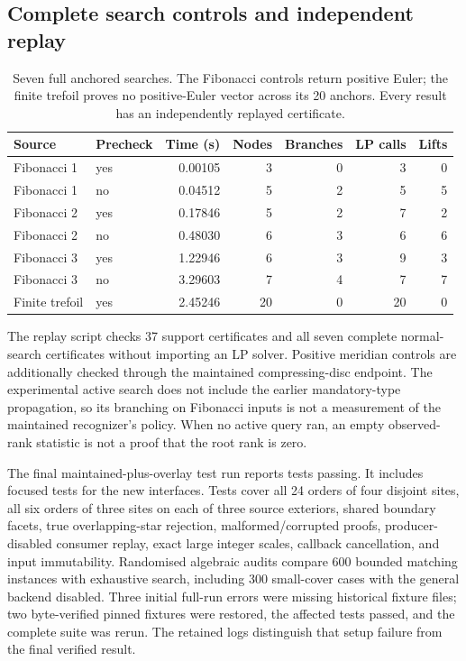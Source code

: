 \subsection{Complete search controls and independent replay}

\begin{table}[htbp]
\centering\small
\begin{tabular}{llrrrrr}
\toprule
Source & Precheck & Time (s) & Nodes & Branches & LP calls & Lifts\\
\midrule
Fibonacci 1 &yes&0.00105&3&0&3&0\\
Fibonacci 1 &no &0.04512&5&2&5&5\\
Fibonacci 2 &yes&0.17846&5&2&7&2\\
Fibonacci 2 &no &0.48030&6&3&6&6\\
Fibonacci 3 &yes&1.22946&6&3&9&3\\
Fibonacci 3 &no &3.29603&7&4&7&7\\
Finite trefoil &yes&2.45246&20&0&20&0\\
\bottomrule
\end{tabular}
\caption{Seven full anchored searches. The Fibonacci controls return
positive Euler; the finite trefoil proves no positive-Euler vector across
its 20 anchors. Every result has an independently replayed certificate.}
\label{tab:active-search}
\end{table}

The replay script checks 37 support certificates and all seven complete
normal-search certificates without importing an LP solver. Positive
meridian controls are additionally checked through the maintained
compressing-disc endpoint. The experimental active search does not include
the earlier mandatory-type propagation, so its branching on Fibonacci
inputs is not a measurement of the maintained recognizer's policy.
When no active query ran, an empty observed-rank statistic is not a proof
that the root rank is zero.

The final maintained-plus-overlay test run reports \fulltestcount{} tests
passing. It includes \focusedtestcount{} focused tests for the new
interfaces. Tests cover all 24 orders of four disjoint sites, all six
orders of three sites on each of three source exteriors, shared boundary
facets, true overlapping-star rejection, malformed/corrupted proofs,
producer-disabled consumer replay, exact large integer scales, callback
cancellation, and input immutability. Randomised algebraic audits compare
600 bounded matching instances with exhaustive search, including 300
small-cover cases with the general backend disabled. Three initial full-run
errors were missing historical fixture files; two byte-verified pinned
fixtures were restored, the affected tests passed, and the complete suite
was rerun. The retained logs distinguish that setup failure from the final
verified result.

